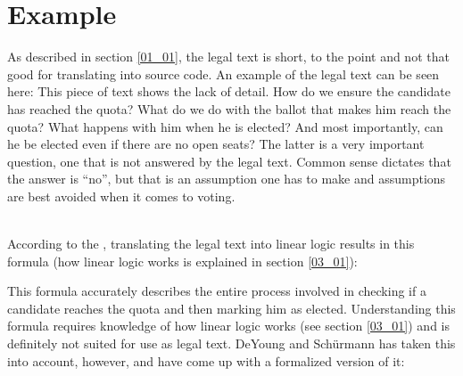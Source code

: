 \section{Example}
\label{02_01}

As described in section \ref{01_01}, the legal text is short, to the point and not that good for translating into source code. An example of the legal text can be seen here:
This piece of text shows the lack of detail. How do we ensure the candidate has reached the quota? What do we do with the ballot that makes him reach the quota? What happens with him when he is elected? And most importantly, can he be elected even if there are no open seats? The latter is a very important question, one that is not answered by the legal text. Common sense dictates that the answer is “no”, but that is an assumption one has to make and assumptions are best avoided when it comes to voting.

 \\
According to the , translating the legal text into linear logic results in this formula (how linear logic works is explained in section \ref{03_01}):

\begin{texto}
\end{texto}

This formula accurately describes the entire process involved in checking if a candidate reaches the quota and then marking him as elected. Understanding this formula requires knowledge of how linear logic works (see section \ref{03_01}) and is definitely not suited for use as legal text. DeYoung and Schürmann has taken this into account, however, and have come up with a formalized version of it:

